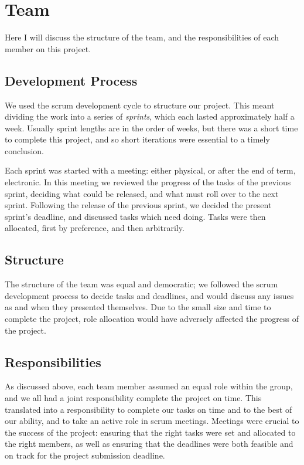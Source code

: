 \section{Team}

Here I will discuss the structure of the team, and the responsibilities of each member on this project.

\subsection{Development Process}

We used the scrum development cycle to structure our project.
This meant dividing the work into a series of \emph{sprints}, which each lasted approximately half a week.
Usually sprint lengths are in the order of weeks, but there was a short time to complete this project, and so short iterations were essential to a timely conclusion.

Each sprint was started with a meeting: either physical, or after the end of term, electronic.
In this meeting we reviewed the progress of the tasks of the previous sprint, deciding what could be released, and what must roll over to the next sprint.
Following the release of the previous sprint, we decided the present sprint's deadline, and discussed tasks which need doing.
Tasks were then allocated, first by preference, and then arbitrarily.

\subsection{Structure}

The structure of the team was equal and democratic; we followed the scrum development process to decide tasks and deadlines, and would discuss any issues as and when they presented themselves.
Due to the small size and time to complete the project, role allocation would have adversely affected the progress of the project.

\subsection{Responsibilities}

As discussed above, each team member assumed an equal role within the group, and we all had a joint responsibility complete the project on time.
This translated into a responsibility to complete our tasks on time and to the best of our ability, and to take an active role in scrum meetings.
Meetings were crucial to the success of the project: ensuring that the right tasks were set and allocated to the right members, as well as ensuring that the deadlines were both feasible and on track for the project submission deadline.
